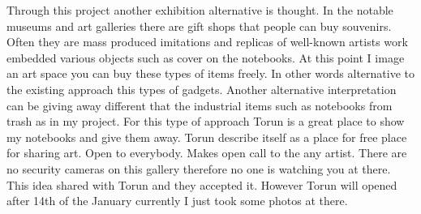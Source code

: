 


Through this project another exhibition alternative is thought. In the notable museums and art galleries there are gift shops that people can buy souvenirs. Often they are mass produced imitations and replicas of well-known artists work embedded various objects such as cover on the notebooks. At this point I image an art space you can buy these types of items freely. In other words alternative to the existing approach this types of gadgets. Another alternative interpretation can be giving away different that the industrial items such as notebooks from trash as in my project. For this type of approach Torun is a great place to show my notebooks and give them away. Torun describe itself as a place for free place for sharing art. Open to everybody. Makes open call to the any artist. There are no security cameras on this gallery therefore no one is watching you at there. This idea shared with Torun and they accepted it. However Torun will opened after 14th of the January currently I just took some photos at there.

